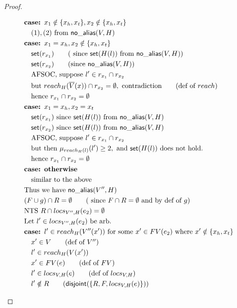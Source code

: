 \documentclass[11pt]{article}
\newcommand{\ms}[1]{\ensuremath{\mathsf{#1}}}
\newcommand{\na}[1]{\mathsf{no\_alias}(#1)}
\newcommand{\dist}[1]{\mathsf{disjoint}(#1)}
\begin{document}
\begin{proof}
\begin{description}
\begin{align*}
  & \textbf{case: } x_1 \notin \{x_h,x_t\}, x_2 \notin \{x_h,x_t\}\\
  &\quad (1), (2) \text{ from } \na{V,H}\\
  & \textbf{case: } x_1 = x_h, x_2 \notin \{x_h,x_t\}\\
  &\quad \ms{set}(r_{x_1}) \tag{ since $\ms{set}(H(l))$ from  $\na{V,H}$}\\
  &\quad \ms{set}(r_{x_2}) \tag{since  $\na{V,H}$}\\
  &\quad \text{AFSOC, suppose } l' \in r_{x_1} \cap r_{x_2}\\
  &\quad \text{but } reach_H(\overline V(x)) \cap r_{x_2} = \emptyset, \text{ contradiction} \tag{def of $reach$}\\
  &\quad \text{hence } r_{x_1} \cap r_{x_2} = \emptyset\\
  & \textbf{case: } x_1 = x_h, x_2 = x_t\\
  &\quad \ms{set}(r_{x_1}) \text{ since } \ms{set}(H(l)) \text{ from } \na{V,H}\\
  &\quad \ms{set}(r_{x_2}) \text{ since } \ms{set}(H(l)) \text{ from } \na{V,H}\\
  &\quad \text{AFSOC, suppose } l' \in r_{x_1} \cap r_{x_2}\\
  &\quad \text{but then } \mu_{reach_H(l)}(l') \ge 2, \text{ and } \ms{set}(H(l)) \text{ does not hold}.\\
  &\quad \text{hence } r_{x_1} \cap r_{x_2} = \emptyset\\
  & \textbf{case: otherwise} \\
  &\quad \text{similar to the above}\\
  &\text{Thus we have } \na{V'',H}\\
  &(F \cup g) \cap R = \emptyset \tag{ since $F \cap R = \emptyset$ and by def of $g$}\\
  &\text{NTS } R \cap locs_{V'',H}(e_2) = \emptyset\\
  &\text{Let } l' \in locs_{V'',H}(e_2) \text{ be arb.}\\
  &\textbf{case: }  l' \in reach_{H}(V''(x')) \text{ for some $x' \in FV(e_2)$ where } x' \notin \{x_h,x_t\}\\
  &\quad x' \in V \tag{def of $V''$}\\
  &\quad l' \in reach_{H}(V(x'))\\
  &\quad x' \in FV(e) \tag{def of $FV$}\\
  &\quad l' \in locs_{V,H}(e) \tag{def of $locs_{V,H}$}\\
  &\quad l' \notin R \tag{$\dist{\{R,F,locs_{V,H}(e)\}}$}\\

\end{align*}
\end{description}
\end{proof}
\end{document}
